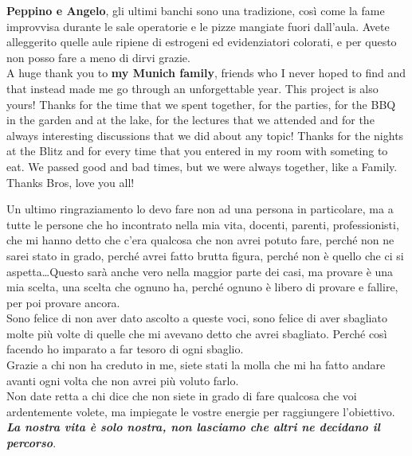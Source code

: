 \textbf{Peppino e Angelo}, gli ultimi banchi sono una tradizione, così come la fame improvvisa durante le sale operatorie e le pizze mangiate fuori dall'aula. Avete alleggerito quelle aule ripiene di estrogeni ed evidenziatori colorati, e per questo non posso fare a meno di dirvi grazie.\\


A huge thank you to \textbf{my Munich family}, friends who I never hoped to find and that instead made me go through an unforgettable year. This project is also yours! Thanks for the time that we spent together, for the parties, for the BBQ in the garden and at the lake, for the lectures that we attended and for the always interesting discussions that we did about any topic! Thanks for the nights at the Blitz and for every time that you entered in my room with someting to eat. We passed good and bad times, but we were always together, like a Family. Thanks Bros, love you all!\\

\pagebreak

Un ultimo ringraziamento lo devo fare non ad una persona in particolare, ma a tutte le persone che ho incontrato nella mia vita, docenti, parenti, professionisti, che mi hanno detto che c'era qualcosa che non avrei potuto fare, perché non ne sarei stato in grado, perché avrei fatto brutta figura, perché non è quello che ci si aspetta\ldots Questo sarà anche vero nella maggior parte dei casi, ma provare è una mia scelta, una scelta che ognuno ha, perché ognuno è libero di provare e fallire, per poi provare ancora.\\
Sono felice di non aver dato ascolto a queste voci, sono felice di aver sbagliato molte più volte di quelle che mi avevano detto che avrei sbagliato. Perché così facendo ho imparato a far tesoro di ogni sbaglio.\\ Grazie a chi non ha creduto in me, siete stati la molla che mi ha fatto andare avanti ogni volta che non avrei più voluto farlo.\\ Non date retta a chi dice che non siete in grado di fare qualcosa che voi ardentemente volete, ma impiegate le vostre energie per raggiungere l'obiettivo.\\

\emph{\textbf{La nostra vita è solo nostra, non lasciamo che altri ne decidano il percorso}}.



